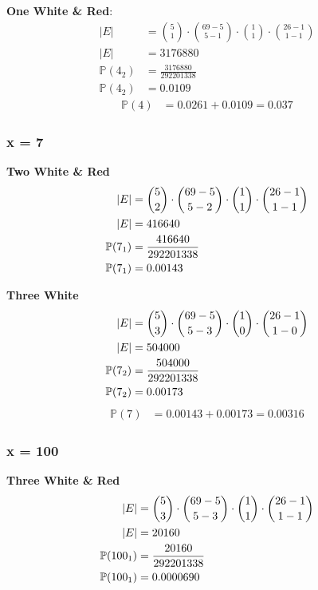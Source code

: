 \documentclass{article}
\begin{document}
\textbf{One White \& Red}:
\begin{align*}
	|E|             & = \binom{5}{1} \cdot \binom{69 - 5}{5 - 1} \cdot \binom{1}{1} \cdot \binom{26 - 1}{1 - 1} \\
	|E|             & = 3176880                                                                                 \\
	\mathbb{P}(4_2) & = \frac{ 3176880 }{ 292201338 }                                                           \\
	\mathbb{P}(4_2) & = 0.0109
\end{align*}
\begin{align*}
	\mathbb{P}(4) & = 0.0261 + 0.0109 = 0.037
\end{align*}

\subsubsection{x = 7}

\textbf{Two White \& Red}
\begin{align*}
	|E|             & = \binom{5}{2} \cdot \binom{69 - 5}{5 - 2} \cdot \binom{1}{1} \cdot \binom{26 - 1}{1 - 1}                  \\
	|E|             & = 416640                       \\
	\mathbb{P}(7_1) & = \frac{ 416640 }{ 292201338 } \\
	\mathbb{P}(7_1) & = 0.00143
\end{align*}

\textbf{Three White}
\begin{align*}
	|E|             & = \binom{5}{3} \cdot \binom{69 - 5}{5 - 3} \cdot \binom{1}{0} \cdot \binom{26 - 1}{1 - 0}                  \\
	|E|             & = 504000                       \\
	\mathbb{P}(7_2) & = \frac{ 504000 }{ 292201338 } \\
	\mathbb{P}(7_2) & = 0.00173
\end{align*}
\begin{align*}
	\mathbb{P}(7) & = 0.00143 + 0.00173 = 0.00316
\end{align*}

\subsubsection{x = 100}

\textbf{Three White \& Red}
\begin{align*}
	|E|               & = \binom{5}{3} \cdot \binom{69 - 5}{5 - 3} \cdot \binom{1}{1} \cdot \binom{26 - 1}{1 - 1}                 \\
	|E|               & = 20160                       \\
	\mathbb{P}(100_1) & = \frac{ 20160 }{ 292201338 } \\
	\mathbb{P}(100_1) & = 0.0000690
\end{align*}
\end{document}
